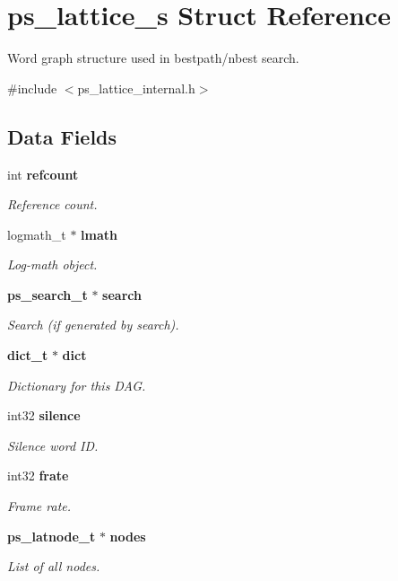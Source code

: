 \section{ps\-\_\-lattice\-\_\-s Struct Reference}
\label{structps__lattice__s}


Word graph structure used in bestpath/nbest search.  




{\ttfamily \#include $<$ps\-\_\-lattice\-\_\-internal.\-h$>$}

\subsection*{Data Fields}
\begin{DoxyCompactItemize}
\item 
int {\bf refcount}
\begin{DoxyCompactList}\small\item\em Reference count. \end{DoxyCompactList}\item 
logmath\-\_\-t $\ast$ {\bf lmath}
\begin{DoxyCompactList}\small\item\em Log-\/math object. \end{DoxyCompactList}\item 
{\bf ps\-\_\-search\-\_\-t} $\ast$ {\bf search}
\begin{DoxyCompactList}\small\item\em Search (if generated by search). \end{DoxyCompactList}\item 
{\bf dict\-\_\-t} $\ast$ {\bf dict}
\begin{DoxyCompactList}\small\item\em Dictionary for this D\-A\-G. \end{DoxyCompactList}\item 
int32 {\bf silence}
\begin{DoxyCompactList}\small\item\em Silence word I\-D. \end{DoxyCompactList}\item 
int32 {\bf frate}
\begin{DoxyCompactList}\small\item\em Frame rate. \end{DoxyCompactList}\item 
{\bf ps\-\_\-latnode\-\_\-t} $\ast$ {\bf nodes}
\begin{DoxyCompactList}\small\item\em List of all nodes. \end{DoxyCompactList}\item 

\end{DoxyCompactItemize}
